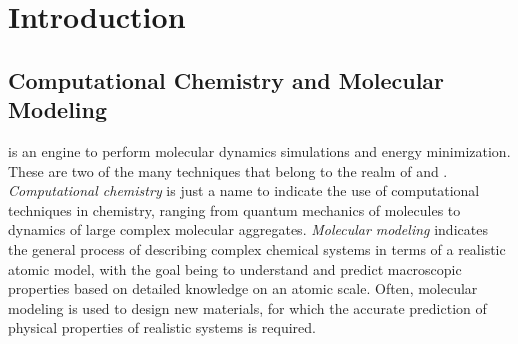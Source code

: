 %
%
%
%
%
%
%

\chapter{Introduction}

\section{Computational Chemistry and Molecular Modeling}

\label{sec:Compchem}

{\gromacs} is an engine to perform molecular dynamics simulations and 
energy minimization. These are two of the many techniques that belong 
to the realm of  and 
. 
{\em Computational chemistry} is just a name to indicate the use of 
computational techniques in chemistry, ranging from quantum mechanics 
of molecules to dynamics of large complex molecular aggregates. {\em 
Molecular modeling} indicates the general process of describing 
complex chemical systems in terms of a realistic atomic model, with the 
goal being to understand and predict macroscopic properties based on detailed 
knowledge on an atomic scale. Often, molecular modeling is used to 
design new materials, for which the accurate prediction of physical 
properties of realistic systems is required. 


